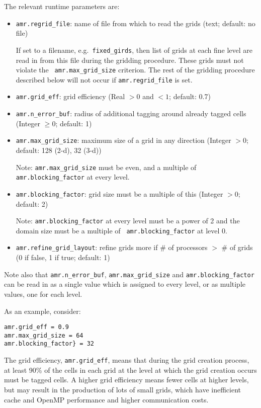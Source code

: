 The relevant runtime parameters are:
\begin{itemize}
\item {\tt amr.regrid\_file}: name of file from which to read the grids (text; default: no file)

  If set to a filename, e.g.\ {\tt fixed\_girds}, then list of grids
  at each fine level are read in from this file during the gridding
  procedure. These grids must not violate the {\tt
  amr.max\_grid\_size} criterion.  The rest of the gridding procedure
  described below will not occur if {\tt amr.regrid\_file} is set.

\item {\tt amr.grid\_eff}: grid efficiency (Real $>0$ and $<1$; default: 0.7)

\item {\tt amr.n\_error\_buf}: radius of additional tagging around already tagged cells
   (Integer $\geq 0$; default: 1)

\item {\tt amr.max\_grid\_size}: maximum size of a grid in any direction (Integer $> 0$;
   default: 128 (2-d), 32 (3-d))

   Note: {\tt amr.max\_grid\_size} must be even, and a multiple of
   {\tt amr.blocking\_factor} at every level.
   
\item {\tt amr.blocking\_factor}:  grid size must be a multiple of this (Integer $> 0$; default: 2)

   Note: {\tt amr.blocking\_factor} at every level must be a power of
   2 and the domain size must be a multiple of {\tt
   amr.blocking\_factor} at level 0.
   
\item {\tt amr.refine\_grid\_layout}: refine grids more if \# of processors $>$ \# of grids
  (0 if false, 1 if true; default: 1) \\
\end{itemize}

Note also that {\tt amr.n\_error\_buf}, {\tt amr.max\_grid\_size} and
{\tt amr.blocking\_factor} can be read in as a single value which is
assigned to every level, or as multiple values, one for each level.

As an example, consider:
\begin{lstlisting}
amr.grid_eff = 0.9
amr.max_grid_size = 64 
amr.blocking_factor} = 32
\end{lstlisting}

The grid efficiency, {\tt amr.grid\_eff}, means that during the grid
creation process, at least 90\% of the cells in each grid at the level
at which the grid creation occurs must be tagged cells.  A higher
grid efficiency means fewer cells at higher levels, but may result
in the production of lots of small grids, which have inefficient cache
and OpenMP performance and higher communication costs.

